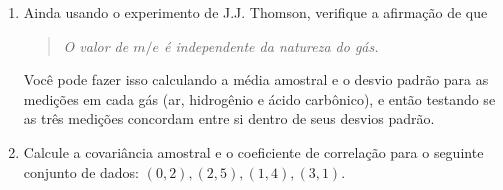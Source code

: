 \begin{enumerate}[label=\textbf{\arabic{chapter}.\arabic*.}]
	\item Ainda usando o experimento de J.J. Thomson, verifique a afirmação de que
	\begin{quote}
	\textit{O valor de $m/e$ é independente da natureza do gás.}
	\end{quote}
	Você pode fazer isso calculando a média amostral e o desvio padrão para as medições em cada gás (ar, hidrogênio e ácido carbônico), e então testando se as três medições concordam entre si dentro de seus desvios padrão.
	
	\item Calcule a covariância amostral e o coeficiente de correlação para o seguinte conjunto de dados: $(0, 2), (2, 5), (1, 4), (3, 1)$.
\end{enumerate}

